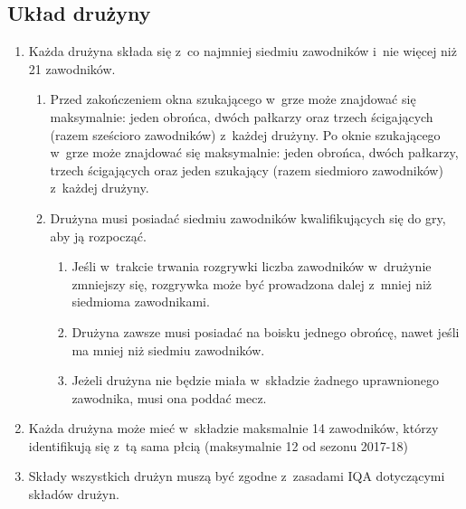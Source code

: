 \documentclass[12pt,a4paper]{article}
\renewcommand{\subsubsection}[1]{
  \oldsubsubsection{#1}%
  \leftskip1.5cm
}
\begin{document}
\subsection{Układ drużyny}

\subsubsection{Składy i~zawodnicy}

\begin{enumerate}
	\item
	      Każda drużyna składa się z~co najmniej siedmiu zawodników i~nie więcej
	      niż 21 zawodników.

	      \begin{enumerate}
		      \item
		            Przed zakończeniem okna szukającego w~grze może znajdować się
		            maksymalnie: jeden obrońca, dwóch pałkarzy oraz trzech ścigających
		            (razem sześcioro zawodników) z~każdej drużyny. Po oknie szukającego
		            w~grze może znajdować się maksymalnie: jeden obrońca, dwóch
		            pałkarzy, trzech ścigających oraz jeden szukający (razem siedmioro
		            zawodników) z~każdej drużyny.
		      \item
		            Drużyna musi posiadać siedmiu zawodników kwalifikujących się do gry,
		            aby ją rozpocząć.

		            \begin{enumerate}
			            \item
			                  Jeśli w~trakcie trwania rozgrywki liczba zawodników w~drużynie
			                  zmniejszy się, rozgrywka może być prowadzona dalej z~mniej niż
			                  siedmioma zawodnikami.
			            \item
			                  Drużyna zawsze musi posiadać na boisku jednego obrońcę, nawet jeśli ma mniej niż siedmiu zawodników.
			            \item
			                  Jeżeli drużyna nie będzie miała w~składzie żadnego uprawnionego
			                  zawodnika, musi ona poddać mecz.
		            \end{enumerate}
	      \end{enumerate}
	\item
	      Każda drużyna może mieć w~składzie maksmalnie 14 zawodników, którzy
	      identifikują się z~tą sama płcią (maksymalnie 12 od sezonu 2017-18)
	\item
	      Składy wszystkich drużyn muszą być zgodne z~zasadami IQA dotyczącymi
	      składów drużyn.
\end{enumerate}
\end{document}
